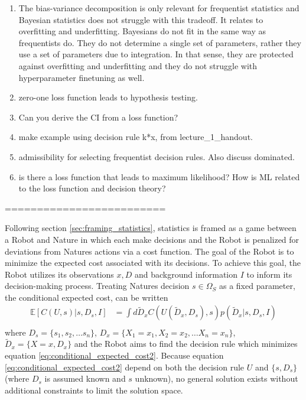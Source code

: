 \begin{enumerate}
	\item The bias-variance decomposition is only relevant for frequentist statistics and Bayesian statistics does not struggle with this tradeoff. It relates to overfitting and underfitting. Bayesians do not fit in the same way as frequentists do. They do not determine a single set of parameters, rather they use a set of parameters due to integration. In that sense, they are protected against overfitting and underfitting and they do not struggle with hyperparameter finetuning as well.
	\item zero-one loss function leads to hypothesis testing.
	\item Can you derive the CI from a loss function?
	\item make example using decision rule k*x, from lecture\_1\_handout.
	\item admissibility for selecting frequentist decision rules. Also discuss dominated.
	\item is there a loss function that leads to maximum likelihood? How is ML related to the loss function and decision theory?
\end{enumerate}


=========================

Following section \ref{sec:framing_statistics}, statistics is framed as a game between a Robot and Nature in which each make decisions and the Robot is penalized for deviations from Natures actions via a cost function. The goal of the Robot is to minimize the expected cost associated with its decisions. To achieve this goal, the Robot utilizes its observations $x,D$ and background information $I$ to inform its decision-making process. Treating Natures decision $s\in \Omega_S$ as a fixed parameter, the conditional expected cost, can be written~\cite{murphy2023probabilistic}
\begin{equation}
	\label{eq:conditional_expected_cost2}
	\begin{split}
		\mathbb{E}[C(U,s)|s,D_s,I] &= \int d\tilde{D}_x  C(U(\tilde{D}_x,D_s),s) p(\tilde{D}_x|s,D_s,I)\\
	\end{split}
\end{equation}
where $D_s = \{s_1,s_2,\dots s_n\}$, $D_x = \{X_1 = x_1, X_2=x_2,\dots X_n=x_n\}$, $\tilde{D}_x = \{X=x,D_x\}$ and the Robot aims to find the decision rule which minimizes equation \eqref{eq:conditional_expected_cost2}. Because equation \eqref{eq:conditional_expected_cost2} depend on both the decision rule $U$ and $\{s,D_s\}$ (where $D_s$ is assumed known and $s$ unknown), no general solution exists without additional constraints to limit the solution space. 

